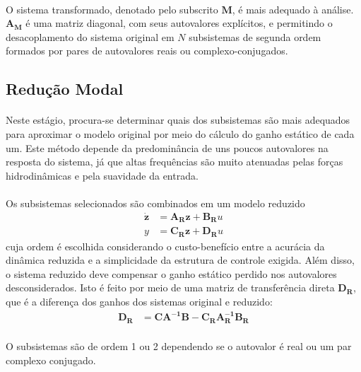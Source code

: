 \documentclass[a4paper,11pt]{scrartcl} %
\numberwithin{equation}{section} %
\numberwithin{figure}{section} %
\numberwithin{table}{section} %
\begin{document}
\paragraph{} O sistema transformado, denotado pelo subscrito $\mathbf{M}$, é mais adequado à análise. $\mathbf{A_M}$ é uma matriz diagonal, com seus autovalores explícitos, e permitindo o desacoplamento do sistema original em $N$ subsistemas de segunda ordem formados por pares de autovalores reais ou complexo-conjugados.


\subsection{Redução Modal}
\paragraph{} Neste estágio, procura-se determinar quais dos subsistemas são mais adequados para aproximar o modelo original por meio do cálculo do ganho estático de cada um. Este método depende da predominância de uns poucos autovalores na resposta do sistema, já que altas frequências são muito atenuadas pelas forças hidrodinâmicas e pela suavidade da entrada.
\paragraph{} Os subsistemas selecionados são combinados em um modelo reduzido \begin{align}
	\mathbf{\dot{z}} &= \mathbf{A_R}\mathbf{z}+\mathbf{B_R}u\\
	y &= \mathbf{C_R}\mathbf{z}+\mathbf{D_R}u
\end{align} cuja ordem é escolhida considerando o custo-benefício entre a acurácia da dinâmica reduzida e a simplicidade da estrutura de controle exigida. Além disso, o sistema reduzido deve compensar o ganho estático perdido nos autovalores desconsiderados. Isto é feito por meio de uma matriz de transferência direta $\mathbf{D_R}$, que é a diferença dos ganhos dos sistemas original e reduzido: \begin{align}
	\mathbf{D_R}&=\mathbf{C}\mathbf{A^{-1}}\mathbf{B}-\mathbf{C_R}\mathbf{A_R^{-1}}\mathbf{B_R}
\end{align}

\paragraph{} O subsistemas são de ordem 1 ou 2 dependendo se o autovalor é real ou um par complexo conjugado. %
\end{document}
